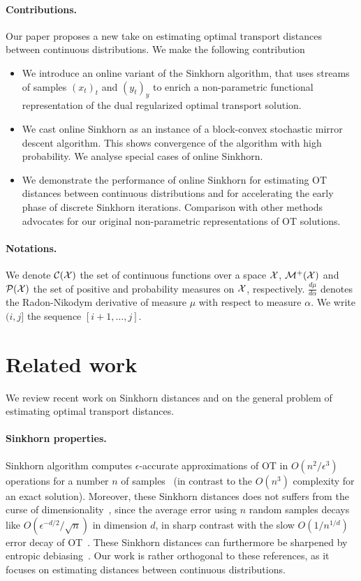 \paragraph{Contributions.} Our paper proposes a new take on estimating optimal transport distances between continuous distributions. We make the following contribution
\begin{itemize}
    \item We introduce an online variant of the Sinkhorn algorithm, that uses
    streams of samples $(x_t)_t$ and $(y_t)_y$ to enrich a non-parametric
    functional representation of the dual regularized optimal transport solution.
    \item We cast online Sinkhorn as an instance of a block-convex stochastic mirror
    descent algorithm. This shows convergence of the algorithm
    with high probability. We analyse special cases of online Sinkhorn.
    \item We demonstrate the performance of online Sinkhorn for estimating OT
    distances between continuous distributions and for accelerating the early phase of discrete Sinkhorn iterations. Comparison with other methods advocates for our original non-parametric representations of OT solutions.
\end{itemize}

\paragraph{Notations.} We denote $\mathcal{C}(\mathcal{X})$ the set of continuous functions over
a space $\mathcal{X}$, $\mathcal{M}^+(\mathcal{X})$ and $\mathcal{P}(\mathcal{X})$ the set of positive and probability
measures on $\mathcal{X}$, respectively. $\frac{d \mu}{d \alpha}$ denotes the
Radon-Nikodym derivative of measure $\mu$ with respect to measure $\alpha$. We
write $(i, j]$ the sequence $[i+1, \dots, j]$.


\section{Related work}\label{sec:related}

We review recent work on Sinkhorn distances and on the general problem of estimating optimal transport distances. 

\paragraph{Sinkhorn properties.} Sinkhorn algorithm computes $\epsilon$-accurate
approximations of OT in $O(n^2/\epsilon^3)$ operations for a number $n$ of
samples~\citep{altschuler2017near} (in contrast to the $O(n^3)$ complexity for an
exact solution). Moreover, these Sinkhorn distances does not suffers from the
curse of dimensionality~\citep{2019-Genevay-aistats}, since the average error
using $n$ random samples decays like $O(\epsilon^{-d/2}/\sqrt{n})$ in dimension
$d$, in sharp contrast with the slow $O(1/n^{1/d})$ error decay of
OT~\citep{dudley_speed_1969,weed2019sharp}. These Sinkhorn distances can furthermore be sharpened
by entropic debiasing~\citep{2019-Feydy-aistats}. Our work is rather orthogonal to these references, as it focuses on estimating distances between continuous distributions.

